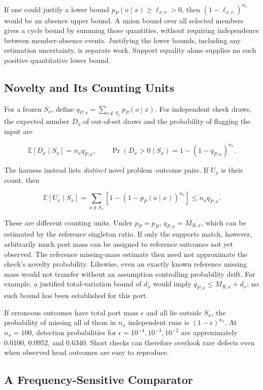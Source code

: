 \documentclass[10pt,letterpaper]{article}
\begin{document}
If one could justify a lower bound \(p_P(o\mid x)\ge\ell_{x,o}>0\), then
\((1-\ell_{x,o})^{n_x}\) would be an absence upper bound. A union bound over all selected
members gives a cycle bound by summing those quantities, without requiring independence
between member-absence events. Justifying the lower bounds, including any estimation
uncertainty, is separate work. Support equality alone supplies no such positive
quantitative lower bound.

\subsection{Novelty and Its Counting Units}\label{sec:novelty}

For a frozen \(S_x\), define \(q_{P,x}=\sum_{o\notin S_x}p_P(o\mid x)\). For independent
check draws, the expected number \(D_x\) of out-of-set draws and the probability of
flagging the input are

\[
\mathbb E[D_x\mid S_x]=n_xq_{P,x},\qquad
\Pr(D_x>0\mid S_x)=1-(1-q_{P,x})^{n_x}.
\]

The harness instead lists \emph{distinct} novel problem--outcome pairs. If \(U_x\) is
their count, then

\[
\mathbb E[U_x\mid S_x]
=\sum_{o\notin S_x}\left[1-(1-p_P(o\mid x))^{n_x}\right]
\le n_xq_{P,x}.
\]

These are different counting units. Under \(p_P=p_R\), \(q_{P,x}=M_{R,x}\), which can be
estimated by the reference singleton ratio. If only the supports match, however,
arbitrarily much port mass can be assigned to reference outcomes not yet observed. The
reference missing-mass estimate then need not approximate the check's novelty probability.
Likewise, even an exactly known reference missing mass would not transfer without an
assumption controlling probability drift. For example, a justified total-variation bound
of \(d_x\) would imply \(q_{P,x}\le M_{R,x}+d_x\); no such bound has been established for
this port.

If erroneous outcomes have total port mass \(\epsilon\) and all lie outside \(S_x\), the
probability of missing all of them in \(n_x\) independent runs is \((1-\epsilon)^{n_x}\).
At \(n_x=100\), detection probabilities for \(\epsilon=10^{-4},10^{-3},10^{-2}\) are
approximately 0.0100, 0.0952, and 0.6340. Short checks can therefore overlook rare defects
even when observed head outcomes are easy to reproduce.

\subsection{A Frequency-Sensitive Comparator}\label{sec:frequency}
\end{document}
